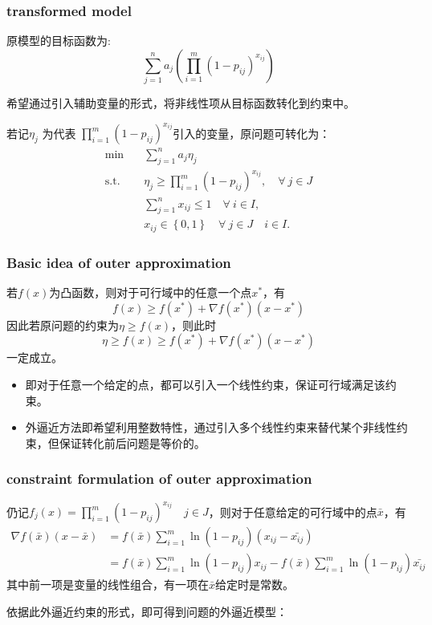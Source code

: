 \documentclass[CJK,10pt]{beamer}
\begin{document}
\begin{frame}
    \frametitle{transformed model}
    原模型的目标函数为:
    \begin{equation*}
        \sum_{j=1}^n a_j \left( \prod_{i=1}^m (1 -  p_{ij})^{x_{ij}} \right)
    \end{equation*}
    {\footnotesize
    希望通过引入辅助变量的形式，将非线性项从目标函数转化到约束中。
    
    若记$\eta_j$ 为代表 $\prod_{i=1}^m (1 -  p_{ij})^{x_{ij}}$引入的变量，原问题可转化为：
    \begin{align*} \tag{S0'}
        \min\quad & \sum_{j=1}^n a_j \eta_j \\ 
        \mathrm{s. t.}\quad & \eta_j \geq \prod_{i=1}^m (1 -  p_{ij})^{x_{ij}}, \quad \forall ~ j \in J \\ 
        &\sum_{j=1}^n x_{ij} \leq 1\quad \forall ~ i \in I,\\
        & x_{ij} \in \left\{ 0,1 \right\} \quad \forall ~ j\in J\quad i \in I.
    \end{align*}
    }
\end{frame}

\begin{frame}
    \frametitle{Basic idea of outer approximation}
    若$f(x)$为凸函数，则对于可行域中的任意一个点$x^*$，有
    \begin{equation*}
        f(x) \geq f(x^*) + \nabla f(x^*)(x - x^*)
    \end{equation*}
    因此若原问题的约束为$\eta \geq f(x)$，则此时
    \begin{equation*}
        \eta \geq f(x) \geq f(x^*) + \nabla f(x^*)(x - x^*)
    \end{equation*}
    一定成立。
    \begin{itemize}
        \item 即对于任意一个给定的点，都可以引入一个线性约束，保证可行域满足该约束。
        \item 外逼近方法即希望利用整数特性，通过引入多个线性约束来替代某个非线性约束，但保证转化前后问题是等价的。
    \end{itemize}
    
    
\end{frame}

\begin{frame}
    \frametitle{constraint formulation of outer approximation}
    仍记$f_j(x) =  \prod_{i=1}^m (1 -  p_{ij})^{x_{ij}}\quad j \in J$，则对于任意给定的可行域中的点$\bar{x}$，有
    \begin{align*}
        \nabla f(\bar{x})(x - \bar{x}) & = f(\bar{x})\sum_{i = 1}^m \ln(1-p_{ij})(x_{ij} - \bar{x_{ij}})\\
        &= f(\bar{x})\sum_{i = 1}^m \ln(1-p_{ij})x_{ij} - f(\bar{x})\sum_{i = 1}^m \ln(1-p_{ij})\bar{x_{ij}}
    \end{align*}
    其中前一项是变量的线性组合，有一项在$\bar{x}$给定时是常数。

    依据此外逼近约束的形式，即可得到问题的外逼近模型：
\end{frame}
\end{document}
